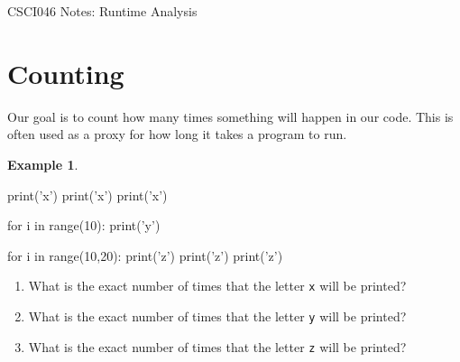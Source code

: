 \documentclass[10pt]{article}
\theoremstyle{definition}
\newtheorem{example}{Example}
\begin{document}
\begin{center}
    {
\Large
CSCI046 Notes: Runtime Analysis
}

\end{center}



\section{Counting}
Our goal is to count how many times something will happen in our code.
This is often used as a proxy for how long it takes a program to run.

\begin{example}~

\begin{python}
print('x')
print('x')
print('x')

for i in range(10):
    print('y')

for i in range(10,20):
    print('z')
    print('z')
    print('z')
\end{python}
    \begin{enumerate}
        \item What is the exact number of times that the letter \texttt{x} will be printed?
            \vspace{1.5in}
        \item What is the exact number of times that the letter \texttt{y} will be printed?
            \vspace{1.5in}
        \item What is the exact number of times that the letter \texttt{z} will be printed?
    \end{enumerate}
\end{example}
\end{document}
